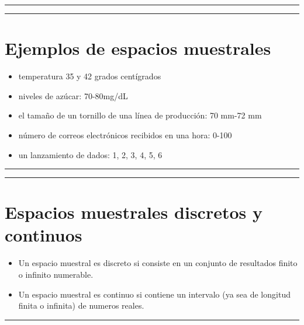 \documentclass[
]{book}
\providecommand{\tightlist}{%
  \setlength{\itemsep}{0pt}\setlength{\parskip}{0pt}}
\begin{document}
\begin{center}\rule{0.5\linewidth}{0.5pt}\end{center}

\begin{center}\rule{0.5\linewidth}{0.5pt}\end{center}

\hypertarget{ejemplos-de-espacios-muestrales}{%
\section{Ejemplos de espacios muestrales}\label{ejemplos-de-espacios-muestrales}}

\begin{itemize}
\tightlist
\item
  temperatura 35 y 42 grados centígrados
\item
  niveles de azúcar: 70-80mg/dL
\item
  el tamaño de un tornillo de una línea de producción: 70 mm-72 mm
\item
  número de correos electrónicos recibidos en una hora: 0-100
\item
  un lanzamiento de dados: 1, 2, 3, 4, 5, 6
\end{itemize}

\begin{center}\rule{0.5\linewidth}{0.5pt}\end{center}

\begin{center}\rule{0.5\linewidth}{0.5pt}\end{center}

\hypertarget{espacios-muestrales-discretos-y-continuos}{%
\section{Espacios muestrales discretos y continuos}\label{espacios-muestrales-discretos-y-continuos}}

\begin{itemize}
\item
  Un espacio muestral es discreto si consiste en un conjunto de resultados finito o infinito numerable.
\item
  Un espacio muestral es continuo si contiene un intervalo (ya sea de longitud finita o infinita) de
  numeros reales.
\end{itemize}

\begin{center}\rule{0.5\linewidth}{0.5pt}\end{center}
\end{document}
